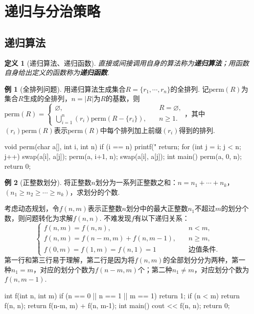 \documentclass[12pt, a4paper, oneside]{ctexart}
\newtheorem{definition}{定义}[section]
\numberwithin{equation}{section}  %
\theoremstyle{definition}
\newtheorem{example}{例}[section]
\let\geq=\geqslant %
\begin{document}
\section{递归与分治策略}
\subsection{递归算法}
\begin{definition}[递归算法、递归函数]
    直接或间接调用自身的算法称为\textbf{递归算法}；用函数自身给出定义的函数称为\textbf{递归函数}.
\end{definition}
\begin{example}[全排列问题]
    用递归算法生成集合$R=\{r_1,\cdots, r_n\}$的全排列. 记$\text{perm}(R)$为集合$R$生成的全排列，$n = |R|$为$R$的基数，则$\text{perm}(R) = \begin{cases}
        \varnothing,&\quad R=\varnothing,\\
        \bigcup_{i=1}^n(r_i)\text{perm}(R-\{r_i\}),&\quad n\geq 1.
    \end{cases}$，其中$(r_i)\text{perm}(R)$表示$\text{perm}(R)$中每个排列加上前缀$(r_i)$得到的排列.
    \begin{cppcode}
void perm(char a[], int i, int n) {
    if (i == n) {
        printf("%
        return;
    }
    for (int j = i; j < n; j++) {
        swap(a[i], a[j]);
        perm(a, i+1, n);
        swap(a[i], a[j]);
    }
} 
int main() {
    perm(a, 0, n);
    return 0;
}
    \end{cppcode}
\end{example}
\begin{example}[正整数划分]
    将正整数$n$划分为一系列正整数之和：$n=n_1+\cdots+n_k$，$(n_1\geq n_2\geq \cdots\geq n_k)$，求划分的个数.
    
    考虑动态规划，令$f(n,m)$表示正整数$n$划分中的最大正整数$n_1$不超过$m$的划分个数，则问题转化为求解$f(n,n)$. 不难发现$f$有以下递归关系：
    \begin{equation*}
        \begin{cases}
            f(n,m) = f(n,n),&\quad n<m,\\
            f(n,m) = f(n-m, m)+f(n,m-1),&\quad n\geq m,\\
            f(0,m) = f(1,m) = f(n, 1) = 1&\quad \text{边值条件}.
        \end{cases}
    \end{equation*}
    第一行和第三行易于理解，第二行是因为将$f(n,m)$的全部划分分为两种，第一种$n_1=m$，对应的划分个数为$f(n-m,m)$个；第二种$n_1\neq m$，对应划分个数为$f(n,m-1)$.
    \begin{cppcode}
int f(int n, int m) {
    if (n == 0 || n == 1 || m == 1) return 1;
    if (n < m) return f(n, n);
    return f(n-m, m) + f(n, m-1);
}
int main() {
    cout << f(n, n);
    return 0;
}
    \end{cppcode}
\end{example}
\end{document}
